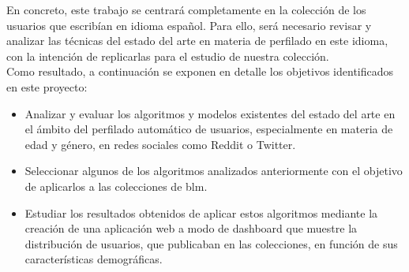 En concreto, este trabajo se centrará completamente en la colección de los usuarios que escribían en idioma español. Para ello, será necesario revisar y analizar las técnicas del estado del arte en materia de perfilado en este idioma, con la intención de replicarlas para el estudio de nuestra colección.\\
Como resultado, a continuación se exponen en detalle los objetivos identificados en este proyecto:\\
\begin{itemize}
    \item Analizar y evaluar los algoritmos y modelos existentes del estado del arte en el ámbito del perfilado automático  de usuarios, especialmente en materia de edad y género, en redes sociales como Reddit o Twitter.
    \item Seleccionar algunos de los algoritmos analizados anteriormente con el objetivo de aplicarlos a las colecciones de \acrshort{blm}.
    \item Estudiar los resultados obtenidos de aplicar estos algoritmos mediante la creación de una aplicación web a modo de dashboard que muestre la distribución de usuarios, que publicaban en las colecciones, en función de sus características demográficas.
\end{itemize}

